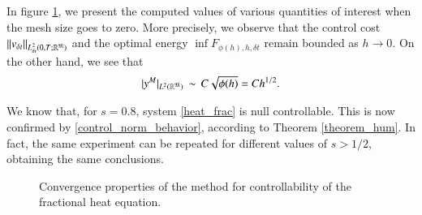 
In figure \ref{figure_case1}, we present the computed values of various quantities of interest when the mesh size goes to zero. More precisely, we observe that the control cost $\|v_{\delta t}\|_{L^2_{\delta t}(0,T;\mathbb R^{\mathfrak{M}})}$ and the optimal energy $\inf F_{\phi(h),h,\delta t}$ remain bounded as $h\to 0$. On the other hand, we see that 
\begin{align}\label{control_norm_behavior}
	|y^M|_{L^2(\mathbb{R}^{\mathfrak{M}})}\,\sim\,C\sqrt{\phi(h)}=Ch^{1/2}. 
\end{align}

We know that, for $s=0.8$, system \eqref{heat_frac} is null controllable. This is now confirmed by \eqref{control_norm_behavior}, according to Theorem \ref{theorem_hum}.  In fact, the same experiment can be repeated for different values of $s>1/2$, obtaining the same conclusions. 
%
\begin{figure}
  \centering
{}
\caption{Convergence properties of the method for controllability of the fractional heat equation. }\label{figure_case1}
\end{figure}


